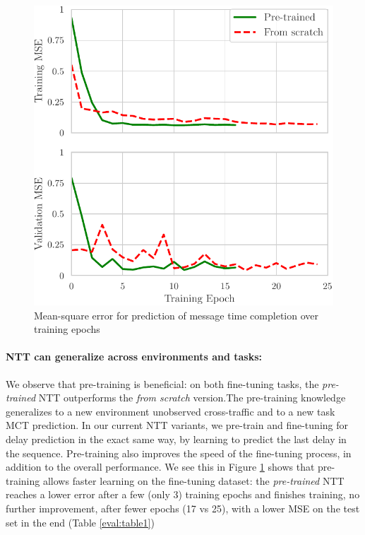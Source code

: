 \begin{figure}[!h]
  \begin{center}
    \includegraphics[scale=0.8]{figures/MCT_loss.pdf}
    \caption{Mean-square error for prediction of message
time completion over training epochs}
    \label{fig:loss_mct}
  \end{center}
\end{figure}

\vspace{-1cm}

\paragraph*{NTT can generalize across environments and tasks:}

We observe that pre-training is beneficial: on both fine-tuning tasks, the \emph{pre-trained} NTT outperforms the \emph{from scratch} version.The pre-training knowledge generalizes to a new environment \ie unobserved cross-traffic and to a new task \ie MCT prediction. In our current NTT variants, we pre-train and fine-tuning for delay prediction in the exact same way, by learning to predict the last delay in the sequence. Pre-training also improves the speed of the fine-tuning process, in addition to the overall performance. We see this in Figure \ref{fig:loss_mct} shows that pre-training allows faster learning on the fine-tuning dataset: the \emph{pre-trained} NTT reaches a lower error after a few (only 3) training epochs and finishes training, \ie no further improvement, after fewer epochs (17 vs 25), with a lower MSE on the test set in the end (Table \ref{eval:table1})


